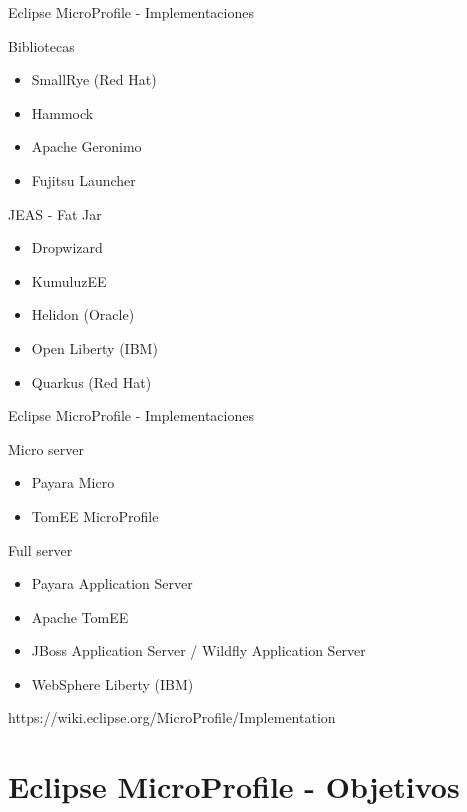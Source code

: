 \documentclass[aspectratio=169]{beamer}
\begin{document}
\begin{frame}{Eclipse MicroProfile - Implementaciones}

Bibliotecas
\begin{itemize}
	\item SmallRye (Red Hat)
	\item Hammock
	\item Apache Geronimo
	\item Fujitsu Launcher
\end{itemize}

JEAS - Fat Jar
\begin{itemize}
	\item Dropwizard
	\item KumuluzEE
	\item Helidon (Oracle)
	\item Open Liberty (IBM)
	\item Quarkus (Red Hat)
\end{itemize}

\end{frame}
\begin{frame}{Eclipse MicroProfile - Implementaciones}

Micro server
\begin{itemize}
	\item Payara Micro
	\item TomEE MicroProfile
\end{itemize}

Full server
\begin{itemize}
	\item Payara Application Server
    \item Apache TomEE
	\item JBoss Application Server / Wildfly Application Server
	\item WebSphere Liberty (IBM)
\end{itemize}

https://wiki.eclipse.org/MicroProfile/Implementation
\end{frame}

{
    \section{Eclipse MicroProfile - Objetivos}
}
\end{document}
